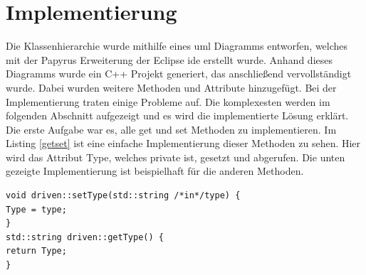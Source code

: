 \section{Implementierung}\label{implement}
Die Klassenhierarchie wurde mithilfe eines \ac{uml} Diagramms entworfen, welches mit der Papyrus Erweiterung der Eclipse \ac{ide} erstellt wurde. Anhand dieses Diagramms wurde ein C++ Projekt generiert, das anschließend vervollständigt wurde. Dabei wurden weitere Methoden und Attribute hinzugefügt. Bei der Implementierung traten einige Probleme auf. Die komplexesten werden im folgenden Abschnitt aufgezeigt und es wird die implementierte Lösung erklärt.\\
Die erste Aufgabe war es, alle \glqq get\grqq{} und \glqq set\grqq{} Methoden zu implementieren.  
Im Listing \ref{getset} ist eine einfache Implementierung dieser Methoden zu sehen. Hier wird das Attribut \glqq Type\grqq{}, welches \glqq private\grqq{} ist, gesetzt und abgerufen. Die unten gezeigte Implementierung ist beispielhaft für die anderen Methoden. 
\begin{lstlisting}[caption =\glqq get\grqq{} und \glqq set\grqq{} Methode ,label=getset]
void driven::setType(std::string /*in*/type) {
Type = type;
}
std::string driven::getType() {
return Type;
}
\end{lstlisting}

